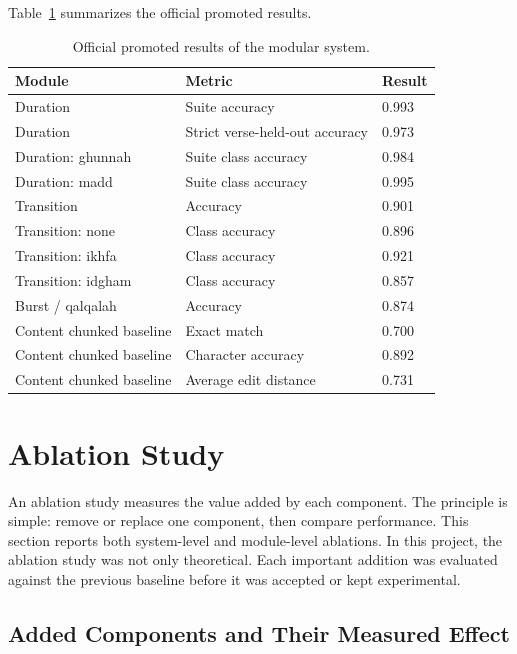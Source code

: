 Table~\ref{tab:official_results} summarizes the official promoted results.

\begin{table}[H]
\centering
\small
\begin{tabularx}{\textwidth}{p{} p{} X}
\toprule
\textbf{Module} & \textbf{Metric} & \textbf{Result} \\
\midrule
Duration & Suite accuracy & 0.993 \\
Duration & Strict verse-held-out accuracy & 0.973 \\
Duration: ghunnah & Suite class accuracy & 0.984 \\
Duration: madd & Suite class accuracy & 0.995 \\
Transition & Accuracy & 0.901 \\
Transition: none & Class accuracy & 0.896 \\
Transition: ikhfa & Class accuracy & 0.921 \\
Transition: idgham & Class accuracy & 0.857 \\
Burst / qalqalah & Accuracy & 0.874 \\
Content chunked baseline & Exact match & 0.700 \\
Content chunked baseline & Character accuracy & 0.892 \\
Content chunked baseline & Average edit distance & 0.731 \\
\bottomrule
\end{tabularx}
\caption{Official promoted results of the modular system.}
\label{tab:official_results}
\end{table}

\section{Ablation Study}

An ablation study measures the value added by each component. The principle is
simple: remove or replace one component, then compare performance. This section
reports both system-level and module-level ablations. In this project, the
ablation study was not only theoretical. Each important addition was evaluated
against the previous baseline before it was accepted or kept experimental.

\subsection{Added Components and Their Measured Effect}

